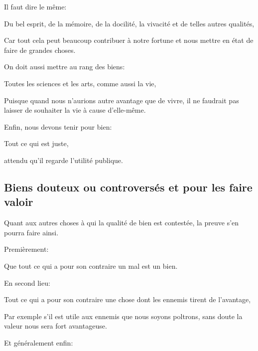 \bigbreak

Il faut dire le même:

\begin{emphpar}
      Du bel esprit, de la mémoire, de la docilité, la vivacité et de telles autres qualités,
\end{emphpar}

Car tout cela peut beaucoup contribuer à notre fortune et nous mettre en état de faire de grandes choses. 

On doit aussi mettre au rang des biens:

\begin{emphpar}
      Toutes les sciences et les arts, comme aussi la vie,
\end{emphpar}

Puisque quand nous n'aurions autre avantage que de vivre, il ne faudrait pas laisser de souhaiter la vie à cause d'elle-même.

\bigbreak

Enfin, nous devons tenir pour bien:

\begin{emphpar}
      Tout ce qui est juste,
\end{emphpar}

attendu qu'il regarde l'utilité publique.

\subsection{Biens douteux ou controversés et pour les faire valoir}

Quant aux autres choses à qui la qualité de bien est contestée, la preuve s'en pourra faire ainsi.

\bigbreak

Premièrement:

\begin{emphpar}
      Que tout ce qui a pour son contraire un mal est un bien. 
\end{emphpar}

En second lieu:

\begin{emphpar}
      Tout ce qui a pour son contraire une chose dont les ennemis tirent de l'avantage,
\end{emphpar}

Par exemple s'il est utile aux ennemis que nous soyons poltrons, sans doute la valeur nous sera fort avantageuse.

Et généralement enfin:

